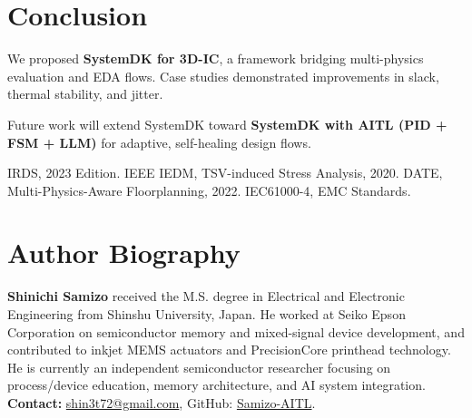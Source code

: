 \documentclass[conference]{IEEEtran}
\begin{document}
\section{Conclusion}
We proposed \textbf{SystemDK for 3D-IC}, a framework bridging multi-physics evaluation and EDA flows. Case studies demonstrated improvements in slack, thermal stability, and jitter. 

Future work will extend SystemDK toward \textbf{SystemDK with AITL (PID + FSM + LLM)} for adaptive, self-healing design flows.

\begin{thebibliography}{1}
 IRDS, 2023 Edition.
 IEEE IEDM, TSV-induced Stress Analysis, 2020.
 DATE, Multi-Physics-Aware Floorplanning, 2022.
 IEC61000-4, EMC Standards.
\end{thebibliography}

\section*{Author Biography}
\noindent\textbf{Shinichi Samizo}
received the M.S. degree in Electrical and Electronic Engineering from Shinshu University, Japan.
He worked at Seiko Epson Corporation on semiconductor memory and mixed-signal device development, and contributed to inkjet MEMS actuators and PrecisionCore printhead technology.
He is currently an independent semiconductor researcher focusing on process/device education, memory architecture, and AI system integration.\\
\textbf{Contact:} \href{mailto:shin3t72@gmail.com}{shin3t72@gmail.com}, GitHub: \href{https://github.com/Samizo-AITL}{Samizo-AITL}.
\end{document}
